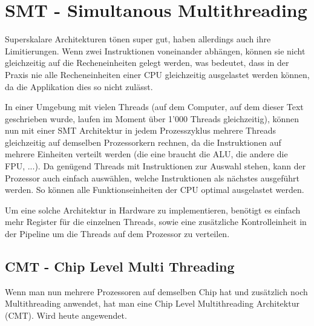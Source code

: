 \section{SMT - Simultanous Multithreading}
Superskalare Architekturen tönen super gut, haben allerdings auch ihre Limitierungen. Wenn zwei Instruktionen voneinander abhängen, können sie nicht gleichzeitig auf die Recheneinheiten gelegt werden, was bedeutet, dass in der Praxis nie alle Recheneinheiten einer CPU gleichzeitig ausgelastet werden können, da die Applikation dies so nicht zulässt.

In einer Umgebung mit vielen Threads (auf dem Computer, auf dem dieser Text geschrieben wurde, laufen im Moment über 1'000 Threads gleichzeitig), können nun mit einer SMT Architektur in jedem Prozesszyklus mehrere Threads gleichzeitig auf demselben Prozessorkern rechnen, da die Instruktionen auf mehrere Einheiten verteilt werden (die eine braucht die ALU, die andere die FPU, ...). Da genügend Threads mit Instruktionen zur Auswahl stehen, kann der Prozessor auch einfach auswählen, welche Instruktionen als nächstes ausgeführt werden. So können alle Funktionseinheiten der CPU optimal ausgelastet werden.

Um eine solche Architektur in Hardware zu implementieren, benötigt es einfach mehr Register für die einzelnen Threads, sowie eine zusätzliche Kontrolleinheit in der Pipeline um die Threads auf dem Prozessor zu verteilen.

\subsection{CMT - Chip Level Multi Threading}
Wenn man nun mehrere Prozessoren auf demselben Chip hat und zusätzlich noch Multithreading anwendet, hat man eine Chip Level Multithreading Architektur (CMT). Wird heute angewendet.

